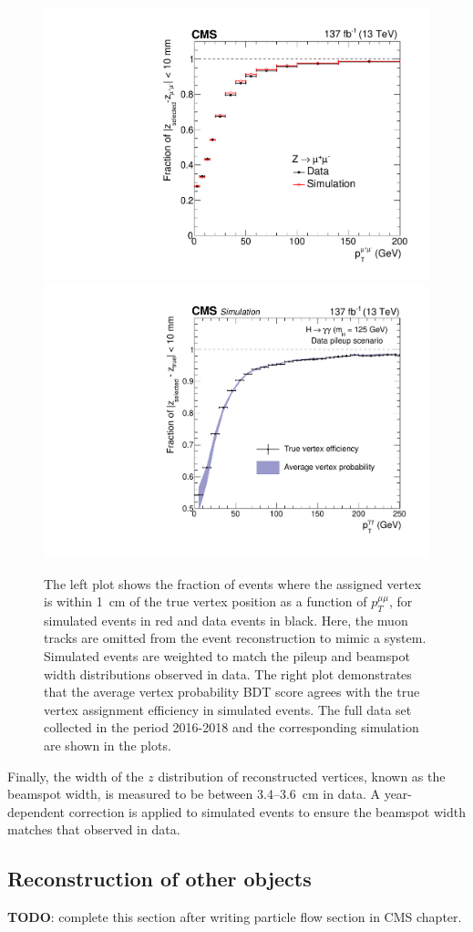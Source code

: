 \begin{figure}[hptb]
  \centering
  \includegraphics[width=.49\textwidth]{Figures/hgg_overview/Zmumu_eff_vs_pt_All.pdf}
  \includegraphics[width=.49\textwidth]{Figures/hgg_overview/AverageProbPlotFullRunIIVersusPt.pdf}
  \caption[Vertex-assignment and vertex-probability BDT]
  {
    The left plot shows the fraction of \Zmumu events where the assigned vertex is within 1~cm of the true vertex position as a function of $p_T^{\mu\mu}$, for simulated events in red and data events in black. Here, the muon tracks are omitted from the event reconstruction to mimic a \Hgg system. Simulated events are weighted to match the pileup and beamspot width distributions observed in data. The right plot demonstrates that the average vertex probability BDT score agrees with the true vertex assignment efficiency in simulated events. The full data set collected in the period 2016-2018 and the corresponding simulation are shown in the plots.
  }
  \label{fig:vertex_selection_0}
\end{figure}

Finally, the width of the $z$ distribution of reconstructed vertices, known as the beamspot width, is measured to be between 3.4--3.6~cm in data. A year-dependent correction is applied to simulated events to ensure the beamspot width matches that observed in data.

\subsection{Reconstruction of other objects}\label{sec:hgg_otherobjects}
\textbf{TODO}: complete this section after writing particle flow section in CMS chapter.

